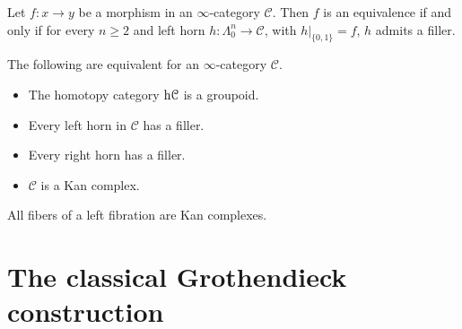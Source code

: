 \documentclass[main.tex]{subfiles}
\begin{document}
\begin{corollary}
  Let $f\colon x \to y$ be a morphism in an $\infty$-category $\mathcal{C}$. Then $f$ is an equivalence if and only if for every $n \geq 2$ and left horn $h\colon \Lambda^{n}_{0} \to \mathcal{C}$, with $h|_{\{0, 1\}} = f$, $h$ admits a filler.
\end{corollary}

\begin{theorem}
  The following are equivalent for an $\infty$-category $\mathcal{C}$.
  \begin{itemize}
    \item The homotopy category $\mathrm{h}\mathcal{C}$ is a groupoid.

    \item Every left horn in $\mathcal{C}$ has a filler.

    \item Every right horn has a filler.

    \item $\mathcal{C}$ is a Kan complex.
  \end{itemize}
\end{theorem}

\begin{corollary}
  \label{cor:fibers_of_left_fibration_are_kan_complexes}
  All fibers of a left fibration are Kan complexes.
\end{corollary}

\section{The classical Grothendieck construction}
\label{sec:the_classical_grothendieck_construction}
\end{document}
